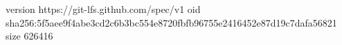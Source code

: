 version https://git-lfs.github.com/spec/v1
oid sha256:5f5aee9f4abe3cd2c6b3bc554e8720fbfb96755e2416452e87d19c7dafa56821
size 626416
